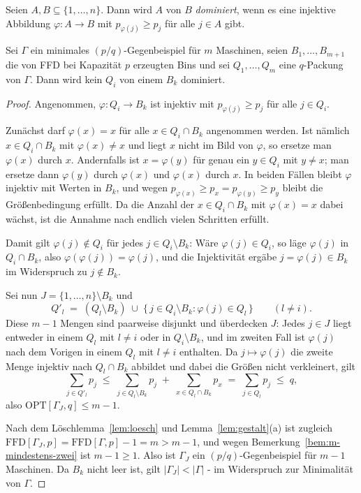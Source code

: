 \begin{definition}
\label{def:dominanz}
Seien $A, B \subseteq \{1, \ldots, n\}$.
Dann wird $A$ von $B$ \emph{dominiert}, wenn es eine injektive Abbildung
$\varphi\colon A \to B$ mit $p_{\varphi(j)} \ge p_j$ für alle $j \in A$ gibt.
\end{definition}

\begin{lemma}
\label{lem:dominanz}
Sei $\Gamma$ ein minimales $(p/q)$-Gegen\-bei\-spiel für $m$ Maschinen, seien
$B_1, \ldots, B_{m+1}$ die von FFD bei Kapazität $p$ erzeugten Bins und sei
$Q_1, \ldots, Q_m$ eine $q$-Packung von $\Gamma$.
Dann wird kein $Q_i$ von einem $B_k$ dominiert.
\end{lemma}

\begin{proof}
Angenommen, $\varphi\colon Q_i \to B_k$ ist injektiv mit $p_{\varphi(j)} \ge p_j$ für alle
$j \in Q_i$.

Zunächst darf $\varphi(x) = x$ für alle $x \in Q_i \cap B_k$ angenommen werden.
Ist nämlich $x \in Q_i \cap B_k$ mit $\varphi(x) \ne x$ und liegt $x$ nicht im Bild von
$\varphi$, so ersetze man $\varphi(x)$ durch $x$.
Andernfalls ist $x = \varphi(y)$ für genau ein $y \in Q_i$ mit $y \ne x$; man ersetze dann
$\varphi(y)$ durch $\varphi(x)$ und $\varphi(x)$ durch $x$.
In beiden Fällen bleibt $\varphi$ injektiv mit Werten in $B_k$, und wegen
$p_{\varphi(x)} \ge p_x = p_{\varphi(y)} \ge p_y$ bleibt die Größenbedingung erfüllt.
Da die Anzahl der $x \in Q_i \cap B_k$ mit $\varphi(x) = x$ dabei wächst, ist die Annahme nach
endlich vielen Schritten erfüllt.

Damit gilt $\varphi(j) \notin Q_i$ für jedes $j \in Q_i \setminus B_k$: Wäre
$\varphi(j) \in Q_i$, so läge $\varphi(j)$ in $Q_i \cap B_k$, also
$\varphi(\varphi(j)) = \varphi(j)$, und die Injektivität ergäbe $j = \varphi(j) \in B_k$ im
Widerspruch zu $j \notin B_k$.

Sei nun $J = \{1, \ldots, n\} \setminus B_k$ und
\[
  Q'_l \;=\; (Q_l \setminus B_k) \;\cup\; \{\, j \in Q_i \setminus B_k : \varphi(j) \in Q_l \,\}
  \qquad (l \ne i).
\]
Diese $m-1$ Mengen sind paarweise disjunkt und überdecken $J$: Jedes $j \in J$ liegt entweder in
einem $Q_l$ mit $l \ne i$ oder in $Q_i \setminus B_k$, und im zweiten Fall ist $\varphi(j)$ nach
dem Vorigen in einem $Q_l$ mit $l \ne i$ enthalten.
Da $j \mapsto \varphi(j)$ die zweite Menge injektiv nach $Q_l \cap B_k$ abbildet und dabei die
Größen nicht verkleinert, gilt
\[
  \sum_{j \in Q'_l} p_j \;\le\; \sum_{j \in Q_l \setminus B_k} p_j
  \;+\; \sum_{x \in Q_l \cap B_k} p_x \;=\; \sum_{j \in Q_l} p_j \;\le\; q ,
\]
also $\mathrm{OPT}[\Gamma_J, q] \le m-1$.

Nach dem Löschlemma~\ref{lem:loesch} und Lemma~\ref{lem:gestalt}(a) ist zugleich
$\mathrm{FFD}[\Gamma_J, p] = \mathrm{FFD}[\Gamma, p] - 1 = m > m-1$, und wegen
Bemerkung~\ref{bem:m-mindestens-zwei} ist $m - 1 \ge 1$.
Also ist $\Gamma_J$ ein $(p/q)$-Gegenbeispiel für $m-1$ Maschinen.
Da $B_k$ nicht leer ist, gilt $|\Gamma_J| < |\Gamma|$ - im Widerspruch zur Minimalität von
$\Gamma$.
\end{proof}

